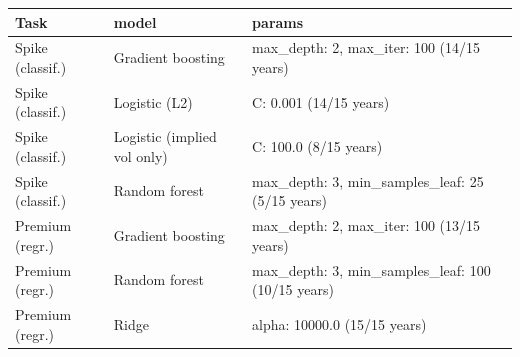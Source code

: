 \begin{tabular}{lll}
\toprule
Task & model & params \\
\midrule
Spike (classif.) & Gradient boosting & max\_depth: 2, max\_iter: 100 (14/15 years) \\
Spike (classif.) & Logistic (L2) & C: 0.001 (14/15 years) \\
Spike (classif.) & Logistic (implied vol only) & C: 100.0 (8/15 years) \\
Spike (classif.) & Random forest & max\_depth: 3, min\_samples\_leaf: 25 (5/15 years) \\
Premium (regr.) & Gradient boosting & max\_depth: 2, max\_iter: 100 (13/15 years) \\
Premium (regr.) & Random forest & max\_depth: 3, min\_samples\_leaf: 100 (10/15 years) \\
Premium (regr.) & Ridge & alpha: 10000.0 (15/15 years) \\
\bottomrule
\end{tabular}
